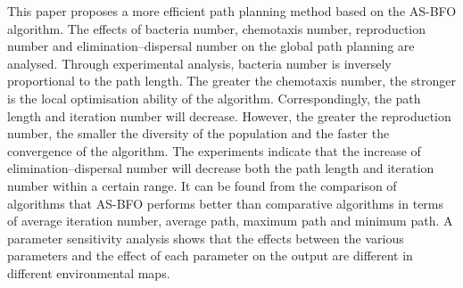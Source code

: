 \documentclass{PDS}%
\theoremstyle{definition}
\begin{document}
This paper proposes a more efficient path planning method based on the AS-BFO algorithm. The
effects of bacteria number, chemotaxis number, reproduction number and
elimination--dispersal number on the global path planning are analysed. Through
experimental analysis, bacteria number is inversely proportional to the path length. The
greater the chemotaxis number, the stronger is the local optimisation ability of the algorithm.
Correspondingly, the path length and iteration number will decrease. However, the greater the
reproduction number, the smaller the diversity of the population and the faster the convergence
of the algorithm. The experiments indicate that the increase of elimination--dispersal
number will decrease both the path length and iteration number within  a certain range. It
can be found from the comparison of algorithms that AS-BFO performs better than
comparative algorithms in terms of average iteration number, average path,
maximum path and minimum path. A parameter sensitivity analysis shows that the effects
between the various parameters and the effect of each parameter on the output are
different in different environmental maps.
\end{document}
